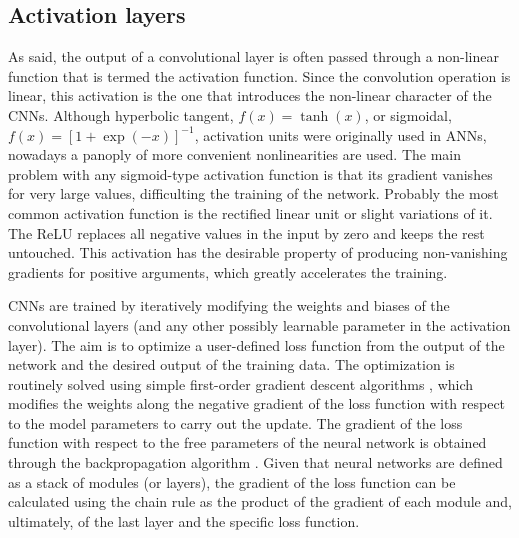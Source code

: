 \subsection{Activation layers}
As said, the output of a convolutional layer is often passed through a non-linear function 
that is termed the activation function. Since the convolution operation is linear, this activation
is the one that introduces the non-linear character of the CNNs. Although hyperbolic
tangent, $f(x)=\tanh(x)$, or sigmoidal, $f(x)=[1+\exp(-x)]^{-1}$, activation units were originally 
used in ANNs, nowadays a panoply of more convenient nonlinearities are used. The main problem 
with any sigmoid-type activation
function is that its gradient vanishes for very large values, difficulting
the training of the network. Probably the most common activation function is 
the rectified linear unit \cite[ReLU;][]{relu10} or slight variations of it. The ReLU
replaces all negative values in the input by zero and keeps the rest untouched. This activation
has the desirable property of producing non-vanishing gradients for positive
arguments, which greatly accelerates the training.

CNNs are trained by iteratively modifying the weights and biases of the convolutional 
layers (and any other possibly learnable parameter in the activation layer). The aim
is to optimize a user-defined loss function from the output
of the network and the desired output of the training data. The optimization
is routinely solved using simple first-order gradient descent algorithms \cite[GD; see][]{Rumelhart1988}, which modifies the weights along
the negative gradient of the loss function with respect to the model parameters
to carry out the update. The gradient of the loss function with respect to the 
free parameters of the neural network is obtained through the
backpropagation algorithm \cite{LeCun1998b}. Given that neural networks are 
defined as a stack of modules (or layers), the gradient of the loss 
function can be calculated using the chain rule as the product of the 
gradient of each module and, ultimately, of the last layer and the
specific loss function.

